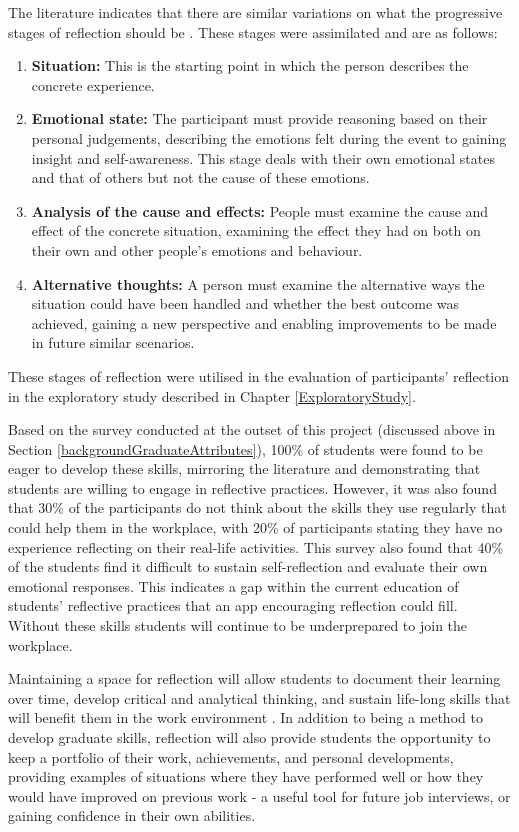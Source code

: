 \documentclass{l4proj}
\begin{document}
The literature indicates that there are similar variations on what the progressive stages of reflection should be \citep{mcdermott_developing_nodate,thurner_development_2020,bruno_reflective_2018}. These stages were assimilated and are as follows:
\begin{enumerate}
    \item \textbf{Situation:} This is the starting point in which the person describes the concrete experience.
    \item \textbf{Emotional state:} The participant must provide reasoning based on their personal judgements, describing the emotions felt during the event to gaining insight and self-awareness. This stage deals with their own emotional states and that of others but not the cause of these emotions.
    \item \textbf{Analysis of the cause and effects:} People must examine the cause and effect of the concrete situation, examining the effect they had on both on their own and other people's emotions and behaviour.
    \item \textbf{Alternative thoughts:} A person must examine the alternative ways the situation could have been handled and whether the best outcome was achieved, gaining a new perspective and enabling improvements to be made in future similar scenarios.
\end{enumerate}
These stages of reflection were utilised in the evaluation of participants' reflection in the exploratory study described in Chapter \ref{ExploratoryStudy}.

Based on the survey conducted at the outset of this project (discussed above in Section \ref{backgroundGraduateAttributes}), 100\% of students were found to be eager to develop these skills, mirroring the literature and demonstrating that students are willing to engage in reflective practices. However, it was also found that 30\% of the participants do not think about the skills they use regularly that could help them in the workplace, with 20\% of participants stating they have no experience reflecting on their real-life activities. This survey also found that 40\% of the students find it difficult to sustain self-reflection and evaluate their own emotional responses. This indicates a gap within the current education of students’ reflective practices that an app encouraging reflection could fill. Without these skills students will continue to be underprepared to join the workplace.

Maintaining a space for reflection will allow students to document their learning over time, develop critical and analytical thinking, and sustain life-long skills that will benefit them in the work environment \citep{mcdermott_developing_nodate}.  In addition to being a method to develop graduate skills, reflection will also provide students the opportunity to keep a portfolio of their work, achievements, and personal developments, providing examples of situations where they have performed well or how they would have improved on previous work - a useful tool for future job interviews, or gaining confidence in their own abilities.
\end{document}
